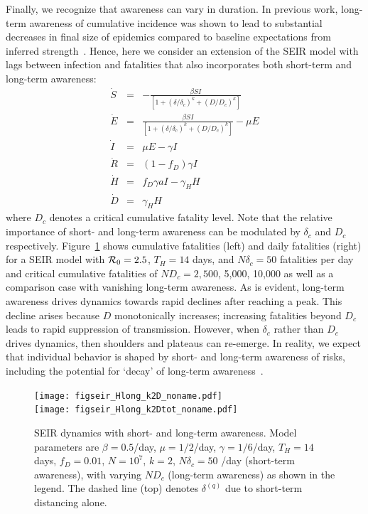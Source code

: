 Finally, we recognize that awareness can vary in duration.  In previous
work, long-term awareness of cumulative incidence
was shown to lead to substantial decreases
in final size of epidemics compared
to baseline expectations from inferred 
strength~\citep{eksin2019systematic}. Hence, 
here we consider an extension of the SEIR model
with lags between infection and fatalities that also incorporates
both short-term and long-term awareness:
\begin{eqnarray}
\dot{S} &=& -\frac{\beta SI}{\left[1+\left(\delta/\delta_c\right)^{k}+\left(D/D_c\right)^k\right]}\\
\dot{E} &=& \frac{\beta SI}{\left[1+\left(\delta/\delta_c\right)^{k}+\left(D/D_c\right)^k\right]}-\mu E\\
\dot{I} &=& \mu E-\gamma I \\
\dot{R} &=& (1-f_D)\gamma I\\
\dot{H} &=& f_D\gamma a I - \gamma_H H\\
\dot{D} &=& \gamma_H H
\end{eqnarray}
where $D_c$ denotes a critical cumulative fatality level. 
Note that the relative importance of short- and long-term
awareness can be modulated by $\delta_c$ and $D_c$ respectively.
Figure~\ref{fig.longterm} shows cumulative fatalities (left)
and daily fatalities (right)
for a SEIR model with ${\cal{R}}_0=2.5$, $T_H=14$ days, and $N\delta_c=50$ 
fatalities per day and critical cumulative fatalities of
$ND_c=2,500$, 5,000, 10,000 as well as a comparison case with vanishing
long-term awareness. As is evident, 
long-term awareness drives dynamics towards rapid declines
after reaching a peak. This decline arises because
$D$ monotonically increases;
increasing fatalities beyond $D_c$ leads to rapid suppression
of transmission.  However, when $\delta_c$ rather than
$D_c$ drives dynamics, then shoulders and plateaus can re-emerge.
In reality, we expect that individual
behavior is shaped by short- and long-term awareness of risks, including
the potential for `decay' of long-term awareness~\citep{funk2009spread,funk2010modelling}.

\begin{figure}[t!]
\begin{center}
\texttt{[image: figseir\_Hlong\_k2D\_noname.pdf]}\\
\texttt{[image: figseir\_Hlong\_k2Dtot\_noname.pdf]}\\
\caption{SEIR dynamics with short- and long-term awareness.
Model parameters are $\beta=0.5$/day, $\mu=1/2$/day, $\gamma=1/6$/day,
$T_H=14$ days, $f_D=0.01$, $N=10^7$, $k=2$, $N\delta_c=50$ /day (short-term
awareness), with varying $ND_c$ (long-term awareness) as shown in the legend.
The dashed line (top) denotes $\delta^{(q)}$ due to short-term
distancing alone.
\label{fig.longterm}}
\end{center}
\end{figure}

